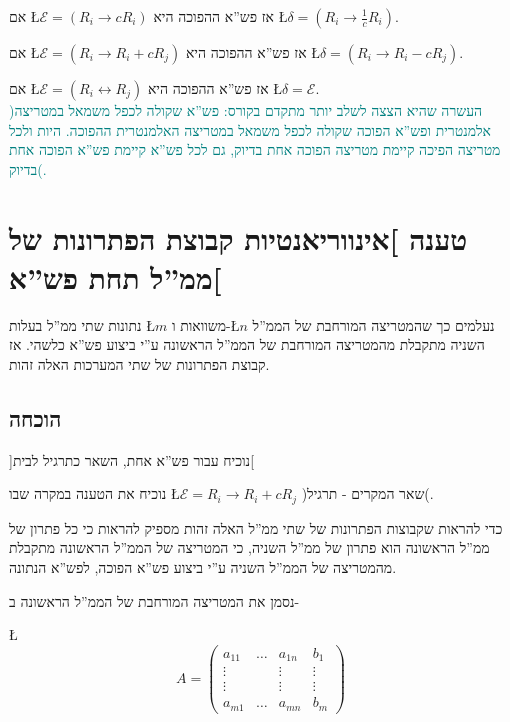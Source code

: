 \documentclass[english,hebrew]{article}
\begin{document}
אם \L{$\mathcal{E}=(R_{i}\to cR_{i})$} אז פש\textquotedblright א
ההפוכה היא \L{$\delta=(R_{i}\to\frac{1}{c}R_{i})$}.

אם \L{$\mathcal{E}=(R_{i}\to R_{i}+cR_{j})$} אז פש\textquotedblright א
ההפוכה היא \L{$\delta=(R_{i}\to R_{i}-cR_{j})$}.

אם \L{$\mathcal{E}=(R_{i}\leftrightarrow R_{j})$} אז פש\textquotedblright א
ההפוכה היא \L{$\delta=\mathcal{E}$}.\\

\textcolor{teal}{)העשרה שהיא הצצה לשלב יותר מתקדם בקורס: פש\textquotedblright א
שקולה לכפל משמאל במטריצה אלמנטרית ופש\textquotedblright א הפוכה שקולה
לכפל משמאל במטריצה האלמנטרית ההפוכה. היות ולכל מטריצה הפיכה קיימת
מטריצה הפוכה אחת בדיוק, גם לכל פש\textquotedblright א קיימת פש\textquotedblright א
הפוכה אחת בדיוק(.}

\section{טענה {]}אינווריאנטיות קבוצת הפתרונות של ממ\textquotedblright ל תחת
פש\textquotedblright א{[}}

נתונות שתי ממ\textquotedblright ל בעלות \L{$m$} משוואות ו-\L{$n$}
נעלמים כך שהמטריצה המורחבת של הממ\textquotedblright ל השניה מתקבלת
מהמטריצה המורחבת של הממ\textquotedblright ל הראשונה ע\textquotedblright י
ביצוע פש\textquotedblright א כלשהי. אז קבוצת הפתרונות של שתי המערכות
האלה זהות.

\subsection{הוכחה}

{]}נוכיח עבור פש\textquotedblright א אחת, השאר כתרגיל לבית{[}

נוכיח את הטענה במקרה שבו \L{$\mathcal{E}=R_{i}\to R_{i}+cR_{j}$}
)שאר המקרים - תרגיל(.

כדי להראות שקבוצות הפתרונות של שתי ממ\textquotedblright ל האלה זהות
מספיק להראות כי כל פתרון של ממ\textquotedblright ל הראשונה הוא פתרון
של ממ\textquotedblright ל השניה, כי המטריצה של הממ\textquotedblright ל
הראשונה מתקבלת מהמטריצה של הממ\textquotedblright ל השניה ע\textquotedblright י
ביצוע פש\textquotedblright א הפוכה, לפש\textquotedblright א הנתונה.

נסמן את המטריצה המורחבת של הממ\textquotedblright ל הראשונה ב-

\L{%
\[
A=\left(\begin{array}{ccc|c}
a_{11} & \dots & a_{1n} & b_{1}\\
\vdots &  & \vdots & \vdots\\
\vdots &  & \vdots & \vdots\\
a_{m1} & \dots & a_{mn} & b_{m}
\end{array}\right)
\]
}%
\end{document}
